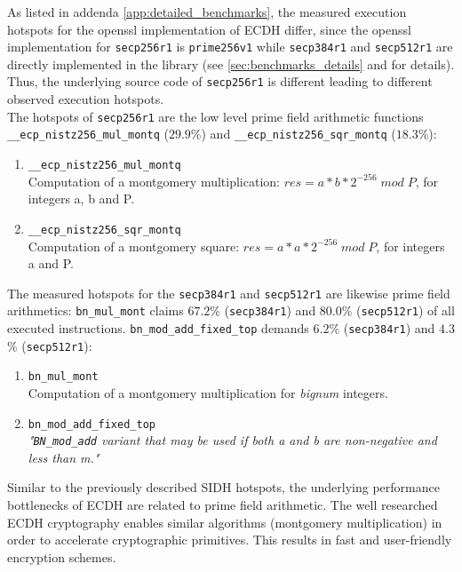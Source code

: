 As listed in addenda \ref{app:detailed_benchmarks}, the measured execution hotspots for the \gls{openssl} implementation of \gls{ECDH} differ, since the \gls{openssl} implementation for \texttt{secp256r1} is \texttt{prime256v1} while \texttt{secp384r1} and \texttt{secp512r1} are directly implemented in the library (see \autoref{sec:benchmarks_details} and \parencite{turner2009elliptic} for details). Thus, the underlying source code of \texttt{secp256r1} is different leading to different observed execution hotspots.\\
The hotspots of \texttt{secp256r1} are the low level prime field arithmetic functions\\\texttt{\_\_ecp\_nistz256\_mul\_montq} ($29.9$\%) and \texttt{\_\_ecp\_nistz256\_sqr\_montq} ($18.3$\%):
\begin{enumerate}
\item \texttt{\_\_ecp\_nistz256\_mul\_montq}\\Computation of a montgomery multiplication: $res = a*b*2^{-256}\;mod\;P$, for integers a, b and P.
\item \texttt{\_\_ecp\_nistz256\_sqr\_montq} \\Computation of a montgomery square: $res = a*a*2^{-256}\;mod\;P$, for integers a and P.
\end{enumerate}
The measured hotspots for the \texttt{secp384r1} and \texttt{secp512r1} are likewise prime field arithmetics: \texttt{bn\_mul\_mont} claims $67.2$\% (\texttt{secp384r1}) and $80.0$\% (\texttt{secp512r1}) of all executed instructions. \texttt{bn\_mod\_add\_fixed\_top} demands $6.2$\% (\texttt{secp384r1}) and $4.3$\% (\texttt{secp512r1}):
\begin{enumerate}
\item \texttt{bn\_mul\_mont}\\Computation of a montgomery multiplication for \textit{bignum} integers.
\item \texttt{bn\_mod\_add\_fixed\_top}\\\textit{"\texttt{BN\_mod\_add} variant that may be used if both a and b are non-negative and less than m."}
\end{enumerate}
Similar to the previously described \gls{SIDH} hotspots, the underlying performance bottlenecks of \gls{ECDH} are related to prime field arithmetic. The well researched \gls{ECDH} cryptography enables similar  algorithms (montgomery multiplication) in order to accelerate cryptographic primitives. This results in fast and user-friendly encryption schemes.

